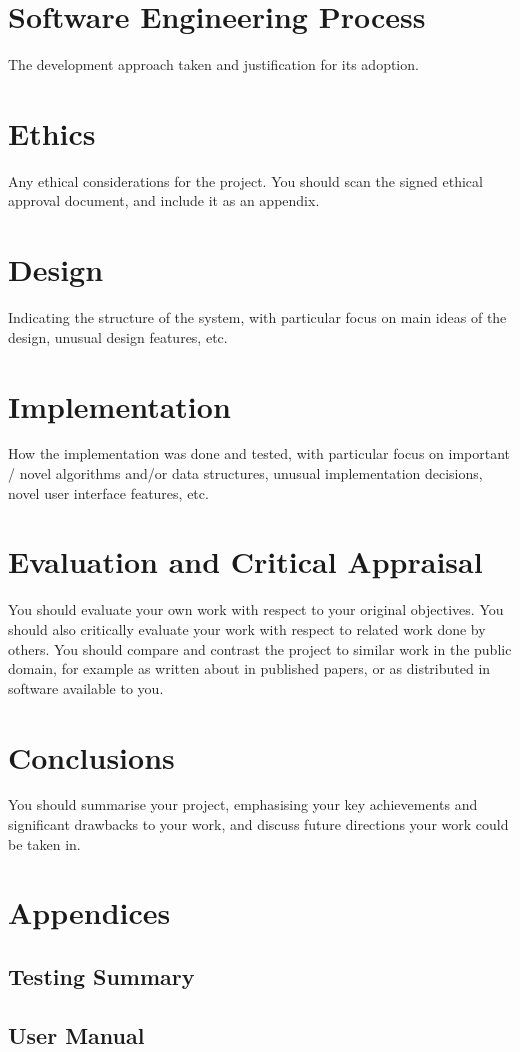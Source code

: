 \documentclass{article}
\begin{document}
\section*{Software Engineering Process}
The development approach taken and justification for its
adoption.
\section*{Ethics}
Any ethical considerations for the project. You should
scan the signed ethical approval document, and include it
as an appendix. 
\section*{Design}
Indicating the structure of the system, with particular
focus on main ideas of the design, unusual design
features, etc.
\section*{Implementation}
How the implementation was done and tested, with
particular focus on important / novel algorithms and/or
data structures, unusual implementation decisions, novel
user interface features, etc.
\section*{Evaluation and Critical Appraisal}
You should evaluate your own work with respect to your
original objectives. You should also critically evaluate
your work with respect to related work done by others.
You should compare and contrast the project to similar
work in the public domain, for example as written about
in published papers, or as distributed in software available to you. 
\section*{Conclusions}
You should summarise your project, emphasising your
key achievements and significant drawbacks to your
work, and discuss future directions your work could be
taken in.
\newpage
\cite{Alipourfard2017} %


\newpage
\section*{Appendices}
\subsection*{Testing Summary}
\subsection*{User Manual}
\end{document}
